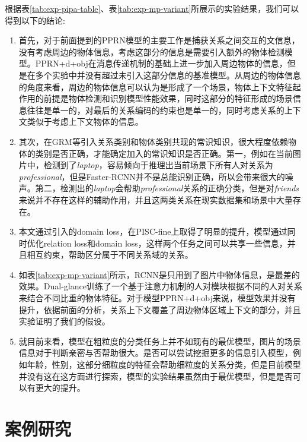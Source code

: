 根据表\ref{tab:exp-pipa-table}、表\ref{tab:exp-mp-variant}所展示的实验结果，我们可以得到以下的结论:
\begin{enumerate}
    \item 首先，对于前面提到的PPRN模型的主要工作是捕获关系之间交互的文信息，没有考虑周边的物体信息，考虑这部分的信息是需要引入额外的物体检测模型。PPRN+d+obj在消息传递机制的基础上进一步加入周边物体的信息，但是在多个实验中并没有超过未引入这部分信息的基准模型。从周边的物体信息的角度来看，周边的物体信息可以认为是形成了一个场景，物体上下文特征起作用的前提是物体检测和识别模型性能效果，同时这部分的特征形成的场景信息往往是单一的，对最后的关系编码的约束也是单一的，同时考虑关系的上下文类似于考虑上下文物体的信息。
    \item 其次，在GRM等引入关系类别和物体类别共现的常识知识，很大程度依赖物体的类别是否正确，才能确定加入的常识知识是否正确。第一，例如在当前图片中，检测到了{\it laptop}，容易倾向于推理出当前场景下所有人对关系为{\it professional}，但是Faster-RCNN并不是总能识别正确，所以会带来很大的噪声。第二，检测出的{\it laptop}会帮助{\it professional}关系的正确分类，但是对{\it friends}来说并不存在这样的辅助作用，并且这两类关系在现实数据集和场景中大量存在。
    \item 本文通过引入的domain loss，在PISC-fine上取得了明显的提升，模型通过同时优化relation loss和domain loss，这样两个任务之间可以共享一些信息，并且相互约束，帮助区分属于不同关系域的关系。
    \item 如表\ref{tab:exp-mp-variant}所示，RCNN是只用到了图片中物体信息，是最差的效果。Dual-glance训练了一个基于注意力机制的人对模块根据不同的人对关系来结合不同比重的物体特征。对于模型PPRN+d+obj来说，模型效果并没有提升，依据前面的分析，关系上下文覆盖了周边物体区域上下文的部分，并且实验证明了我们的假设。
    \item 就目前来看，模型在粗粒度的分类任务上并不如现有的最优模型，图片的场景信息对于判断亲密与否帮助很大。是否可以尝试挖掘更多的信息引入模型，例如年龄，性别，这部分细粒度的特征会帮助细粒度的关系分类，但是目前模型并没有这在这方面进行探索，模型的实验结果虽然由于最优模型，但是是否可以有更大的提升。
\end{enumerate}

\section{案例研究}

